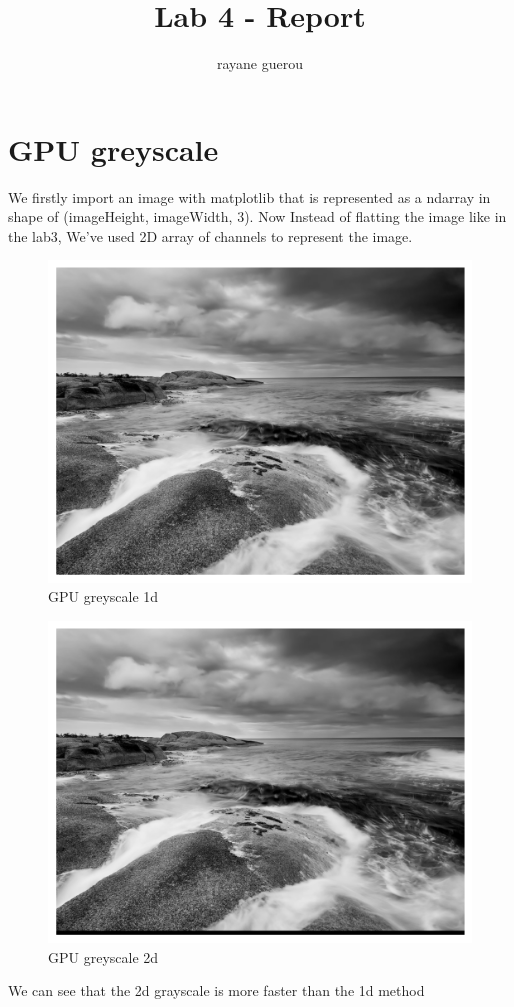 \documentclass[a4paper]{article}
\title{Lab 4 - Report}
\author{rayane guerou}
\begin{document}
\maketitle

\section{GPU greyscale}
We firstly import an image with matplotlib that is represented as a ndarray in shape of (imageHeight, imageWidth, 3).
Now Instead of flatting the image like in the lab3, We've used 2D array of channels to represent the image.

\begin{figure}[h!]
\centering
\includegraphics[scale=0.5]{src/gpu1d.png}
\caption{GPU greyscale 1d}
\end{figure}

\begin{figure}[h!]
    \centering
    \includegraphics[scale=0.5]{src/gpu2d.png}
    \caption{GPU greyscale 2d}
\end{figure}

We can see that the 2d grayscale is more faster than the 1d method
\end{document}
